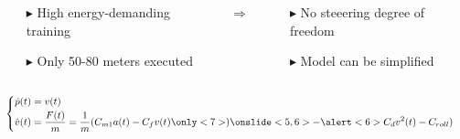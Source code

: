 \documentclass[9pt, aspectratio=169]{beamer}
\begin{document}
\begin{frame}[t]
\begin{columns}
\begin{column}{0.4\textwidth}
 \begin{block}{}
\centering
{} \begin{itemize}
 	 \footnotesize
	\item[$\blacktriangleright$] High energy-demanding training
	\item[$\blacktriangleright$] Only 50-80 meters executed
\end{itemize}
\end{block}
\end{column}
\begin{column}{0.05\textwidth}
\centering
{} $\Rightarrow$
\end{column}
\begin{column}{0.35\textwidth}
\begin{block}{}
\centering
{} \begin{itemize}
 	 \footnotesize 
	\item[$\blacktriangleright$] No steeering degree of freedom 
	\item[$\blacktriangleright$] Model can be simplified
\end{itemize}
\end{block}
\end{column}
\end{columns}

\vspace{0.6cm}

\begin{columns}
\hspace{0.8cm}
\begin{column}{0.4\textwidth}
\vspace{-0.9cm}
\begin{equation*}
	\begin{cases}
 	\begin{aligned}
		\dot{p}(t) &= v(t) \\
		\dot{v}(t) &= \frac{F(t)}{m} = \frac{1}{m} (C_{m1} a(t) - C_f v(t) \only<7>) \onslide<5,6>{- \alert<6>{C_d v^2(t) - C_{roll}})}
	\end{aligned}
	\end{cases}
\end{equation*}
\end{column}


\end{columns}
\end{frame}
\end{document}
